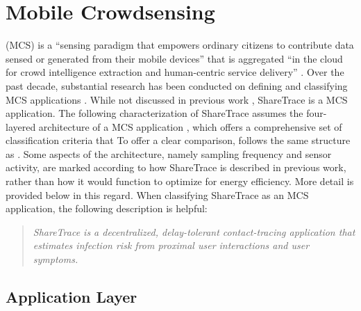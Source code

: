 %

\section{Mobile Crowdsensing}

 (MCS) is a ``sensing paradigm that empowers ordinary citizens to contribute data sensed or generated from their mobile devices'' that is aggregated  ``in the cloud for crowd intelligence extraction and human-centric service delivery'' \citep{Guo2015}. Over the past decade, substantial research has been conducted on defining and classifying MCS applications \cite[and references therein]{Capponi2019, Guo2015}. While not discussed in previous work \cite{Ayday2020, Ayday2021}, ShareTrace is a MCS application. The following characterization of ShareTrace assumes the four-layered architecture of a MCS application \cite{Capponi2019}, which offers a comprehensive set of classification criteria that To offer a clear comparison,  follows the same structure as \citet{Capponi2019}. Some aspects of the architecture, namely sampling frequency and sensor activity, are marked according to how ShareTrace is described in previous work, rather than how it would function to optimize for energy efficiency. More detail is provided below in this regard. When classifying ShareTrace as an MCS application, the following description is helpful:
%
\begin{quote}
	\emph{ShareTrace is a decentralized, delay-tolerant contact-tracing application that estimates infection risk from proximal user interactions and user symptoms.}
\end{quote}

\subsection{Application Layer}

